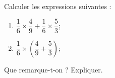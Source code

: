 
\begin{exercice}\label{exosmath-0878}

    Calculer les expressions suivantes :
    \begin{enumerate}
        \item
            \( \dfrac{ 1 }{ 6 }\times \dfrac{ 4 }{ 9 }+\dfrac{ 1 }{ 6 }\times \dfrac{ 5 }{ 3 }\);
        \item
            \( \dfrac{ 1 }{ 6 }\times (\dfrac{ 4 }{ 9 }+\dfrac{ 5 }{ 3 })\);
    \end{enumerate}
    Que remarque-t-on ? Expliquer.

\end{exercice}
